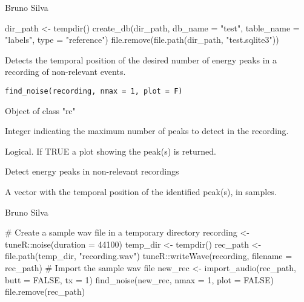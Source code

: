 \documentclass[letterpaper]{book}
\begin{document}
%
\begin{Author}\relax
Bruno Silva
\end{Author}
%
\begin{Examples}
\begin{ExampleCode}
dir_path <- tempdir()
create_db(dir_path, 
db_name = "test", 
table_name = "labels",
type = "reference")
file.remove(file.path(dir_path, "test.sqlite3"))
\end{ExampleCode}
\end{Examples}
%
\begin{Description}\relax
Detects the temporal position of the desired number of
energy peaks in a recording of non-relevant events.
\end{Description}
%
\begin{Usage}
\begin{verbatim}
find_noise(recording, nmax = 1, plot = F)
\end{verbatim}
\end{Usage}
%
\begin{Arguments}
\begin{ldescription}
\item[\code{recording}] Object of class "rc"

\item[\code{nmax}] Integer indicating the maximum number of peaks to detect in
the recording.

\item[\code{plot}] Logical. If TRUE a plot showing the peak(s) is returned.
\end{ldescription}
\end{Arguments}
%
\begin{Details}\relax
Detect energy peaks in non-relevant recordings
\end{Details}
%
\begin{Value}
A vector with the temporal position of the
identified peak(s), in samples.
\end{Value}
%
\begin{Author}\relax
Bruno Silva
\end{Author}
%
\begin{Examples}
\begin{ExampleCode}
# Create a sample wav file in a temporary directory
recording <- tuneR::noise(duration = 44100)
temp_dir <- tempdir()
rec_path <- file.path(temp_dir, "recording.wav")
tuneR::writeWave(recording, filename = rec_path)
# Import the sample wav file
new_rec <- import_audio(rec_path, butt = FALSE, tx = 1)
find_noise(new_rec, nmax = 1, plot = FALSE)
file.remove(rec_path)
\end{ExampleCode}
\end{Examples}
\end{document}

